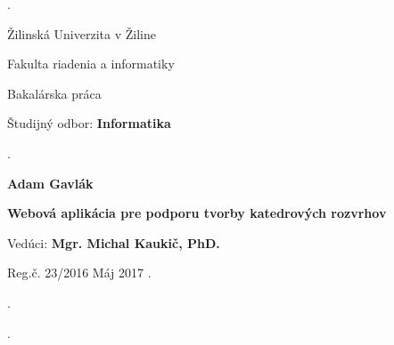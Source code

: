 \begin{titlepage}
\phantom.

\bigskip

\begin{center}
{\sc\LARGE Žilinská Univerzita v Žiline}
\medskip

{\sc\Large Fakulta riadenia a informatiky}

\vfill\vfill\vfill\vfill

{\sc\LARGE Bakalárska práca}

\medskip

{\large Študijný odbor: {\bf Informatika}}
\end{center}


\vfill\vfill\vfill\vfill


\phantom.\hfill
\begin{minipage}{10cm}
\begin{center}
{\large\bf Adam Gavlák}

\medskip

{\large\bf Webová aplikácia pre podporu tvorby katedrových rozvrhov}

\medskip

Vedúci: {\bf Mgr. Michal Kaukič, PhD.}

\medskip
 
\hfill
Reg.č. 23/2016 
\hfill
Máj 2017
\hfill\phantom.
\end{center}
\end{minipage}
\hspace{1.7cm}\phantom.

\vspace{2.9cm}

\phantom.
\end{titlepage}



\begin{abstract}

\noindent
{\sc Gavlák Adam:} {\em Webová aplikácia pre podporu tvorby katedrových rozvrhov}
[Bakalárska práca] 

\noindent
Žilinská Univerzita v~Žiline,  
Fakulta riadenia a informatiky,  
Katedra matematických metód a operačnej analýzy.

\noindent  
Vedúci: Mgr. Michal Kaukič, PhD.

\noindent
FRI ŽU v~Žiline, 2017

\bigskip

Obsahom práce je analýza, návrh a implementácia webovej aplikácie pre podporu tvorby katedrových rozvrhov s využitím moderných webových technológii, ktorá umožní urýchlenie a automatizáciu niektorých interných procesov Katedry matematických metód.


\end{abstract}


